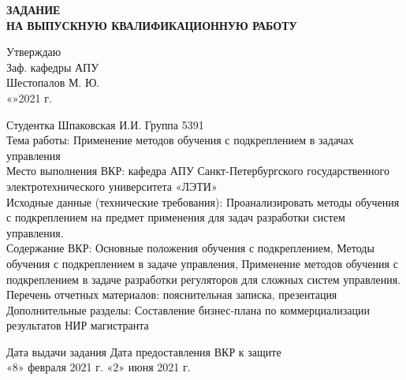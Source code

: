 \newpage

	\begin{center}
		\textbf{ЗАДАНИЕ \\ НА ВЫПУСКНУЮ КВАЛИФИКАЦИОННУЮ РАБОТУ}\\
	\end{center}
\begin{flushright}
Утверждаю\\
Заф. кафедры АПУ\\
\underline{\hspace{3cm}} Шестопалов М. Ю.\\
«\underline{\hspace{0.7cm}}»\underline{\hspace{3cm}}2021 г.
\end{flushright}

\hfill \break
Студентка Шпаковская И.И. \hspace{7cm} Группа 5391\\
Тема работы: Применение методов обучения с подкреплением в задачах \\
управления \\
Место выполнения ВКР: кафедра АПУ Санкт-Петербургского
государственного электротехнического университета «ЛЭТИ» \\
Исходные данные (технические требования): Проанализировать методы обучения с подкреплением на предмет применения для задач разработки систем управления.\\
Содержание ВКР: Основные положения обучения с подкреплением, Методы обучения с подкреплением в задаче управления, Применение методов обучения с подкреплением в задаче разработки регуляторов для сложных систем управления. \\
Перечень отчетных материалов: пояснительная записка, презентация \\
Дополнительные разделы: Составление бизнес-плана по коммерциализации результатов НИР магистранта\\
\vspace{2cm}

\begin{flushleft}
Дата выдачи задания  \hspace{4cm}  Дата предоставления ВКР к защите\\
«8» февраля 2021 г. \hspace{6cm}   «2» июня 2021 г.\\
\end{flushleft}
\vspace{1cm}

